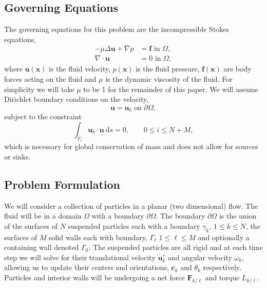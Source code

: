 \documentclass[preprint, 10pt]{elsarticle}
\begin{document}
\subsection{Governing Equations}\label{sec:governing}
The governing equations for this problem are the incompressible Stokes equations,
\begin{subequations}\label{eq:stokes}
\begin{align}
	-\mu\Delta \mathbf{u} + \nabla p &= \mathbf{f} \text{ in }\Omega,\\
	\nabla\cdot\mathbf{u} &= 0 \text{ in }\Omega,
\end{align}
\end{subequations}
where $\mathbf{u}(\mathbf{x})$ is the fluid velocity, $p(\mathbf{x})$ is the fluid pressure, $\mathbf{f}(\mathbf{x})$ are body forces acting on the fluid and $\mu$ is the dynamic viscosity of the fluid. For simplicity we will take $\mu$ to be 1 for the remainder of this paper. We will assume Dirichlet boundary conditions on the velocity,
\begin{equation}\label{eq:boundary_condition}
	 \mathbf{u} = \mathbf{u}_b \text{ on } \partial\Omega,\end{equation}
subject to the constraint 
\begin{equation}\label{eq:compatibility}
	 \int_{\Gamma_i} \mathbf{u}_b\cdot\mathbf{n}~\text{d}s = 0, \qquad 0\leq i \leq N+M,
\end{equation}
which is necessary for global conservation of mass and does not allow for sources or sinks.


\subsection{Problem Formulation}

We will consider a collection of particles in a planar (two dimensional) flow. The fluid will be in a domain $\Omega$ with a boundary $\partial\Omega$. The boundary $\partial\Omega$ is the union of the surfaces of $N$ suspended particles each with a boundary $\gamma_k$, $1\leq k \leq N$, the surfaces of $M$ solid walls each with boundary, $\Gamma_\ell$ $1\leq\ell\leq M$ and optionally a containing wall  denoted $\Gamma_0$. The suspended particles are all rigid and at each time step we will solve for their translational velocity $\mathbf{u}^{\tau}_k$ and angular velocity $\omega_k$, allowing us to update their centers and orientations, $\mathbf{c}_k$ and $\theta_k$ respectively. Particles and interior walls will be undergoing a net force $\mathbf{F}_{k/\ell}$  and torque $L_{k/\ell}$. 
\end{document}
